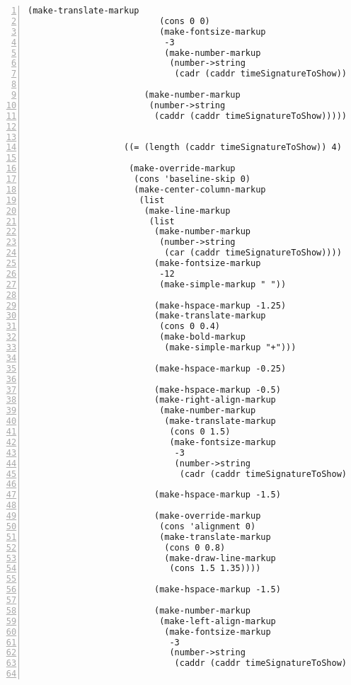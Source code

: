 \begin{Verbatim}[numbers=left,xleftmargin=5mm]
                         (make-translate-markup
                          (cons 0 0)
                          (make-fontsize-markup
                           -3
                           (make-number-markup
                            (number->string
                             (cadr (caddr timeSignatureToShow))))))))

                       (make-number-markup
                        (number->string
                         (caddr (caddr timeSignatureToShow))))))))


                   ((= (length (caddr timeSignatureToShow)) 4)

                    (make-override-markup
                     (cons 'baseline-skip 0)
                     (make-center-column-markup
                      (list
                       (make-line-markup
                        (list
                         (make-number-markup
                          (number->string
                           (car (caddr timeSignatureToShow))))
                         (make-fontsize-markup
                          -12
                          (make-simple-markup " "))

                         (make-hspace-markup -1.25)
                         (make-translate-markup
                          (cons 0 0.4)
                          (make-bold-markup
                           (make-simple-markup "+")))

                         (make-hspace-markup -0.25)

                         (make-hspace-markup -0.5)
                         (make-right-align-markup
                          (make-number-markup
                           (make-translate-markup
                            (cons 0 1.5)
                            (make-fontsize-markup
                             -3
                             (number->string
                              (cadr (caddr timeSignatureToShow)))))))

                         (make-hspace-markup -1.5)

                         (make-override-markup
                          (cons 'alignment 0)
                          (make-translate-markup
                           (cons 0 0.8)
                           (make-draw-line-markup
                            (cons 1.5 1.35))))

                         (make-hspace-markup -1.5)

                         (make-number-markup
                          (make-left-align-markup
                           (make-fontsize-markup
                            -3
                            (number->string
                             (caddr (caddr timeSignatureToShow))))))))


\end{Verbatim}
